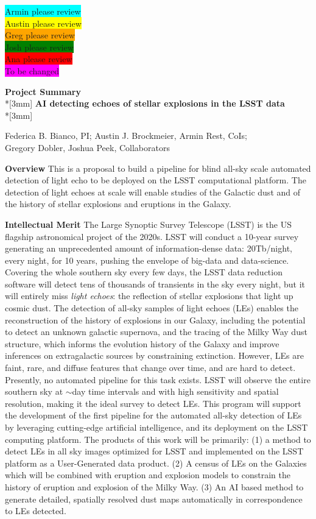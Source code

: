 \documentclass{proposalnsf}
\newcommand{\armin}[1]{\colorbox{cyan}{#1}}
\newcommand{\austin}[1]{\colorbox{yellow}{#1}}
\newcommand{\greg}[1]{\colorbox{orange}{#1}}
\newcommand{\josh}[1]{\colorbox{green}{#1}}
\newcommand{\ana}[1]{\colorbox{red}{#1}}
\newcommand{\changeit}[1]{\colorbox{magenta}{#1}}
\begin{document}
{\LARGE{
\noindent
\armin{Armin please review}\\
\austin{Austin please review}\\
\greg{Greg please review}\\
\josh{Josh please review}\\
\ana{Ana please review}\\
\changeit{To be changed}}}

\clearpage
\begin{center}
{\Large{\bf Project Summary}}\\*[3mm]
{\bf AI detecting echoes of stellar explosions in the LSST data} \\*[3mm]

Federica B.  Bianco, PI; 
Austin J.  Brockmeier, 
Armin Rest, CoIs; \\
Gregory Dobler, 
Joshua Peek, Collaborators
\end{center}
\vspace{-3mm}
{\bf Overview} This is a proposal to build a pipeline for blind all-sky scale automated detection of light echo to be deployed on the LSST computational platform. The detection of light echoes at scale will enable studies of the Galactic dust and of the history of stellar explosions and eruptions in the Galaxy.

\noindent
{\bf Intellectual Merit} The Large Synoptic Survey Telescope (LSST) is the US flagship astronomical project of the 2020s.   LSST will conduct a 10-year survey generating an unprecedented amount of information-dense data: 20Tb/night, every night, for 10 years, pushing the envelope of big-data and data-science.   Covering the whole southern sky every few days, the LSST data reduction software will detect tens of thousands of transients in the sky every night, but it will entirely miss \emph{light echoes}: the reflection of stellar explosions that light up cosmic dust.   The detection of all-sky samples of light echoes (LEs) enables the reconstruction of the history of explosions in our Galaxy, including the potential to detect an unknown galactic supernova, and the tracing of the Milky Way dust structure, which informs the evolution history of the Galaxy and improve inferences on extragalactic sources by constraining extinction.  However, LEs are faint, rare, and diffuse features that change over time, and are hard to detect.  Presently, no automated pipeline for this task exists.  LSST will observe the entire southern sky at $\sim$day time intervals and with high sensitivity and spatial resolution, making it the ideal survey to detect LEs.  This program will support the development of the first pipeline for the automated all-sky detection of LEs by leveraging cutting-edge artificial intelligence, and its deployment on the LSST computing platform.  The products of this work will be primarily: (1) a method to detect LEs in all sky images optimized for LSST and implemented on the LSST platform as a User-Generated data product. (2) A census of LEs on the Galaxies which will be combined with eruption and explosion models to constrain the history of eruption and explosion of the Milky Way. (3) An AI based method to generate detailed, spatially resolved dust maps automatically in correspondence to LEs detected.
\end{document}
